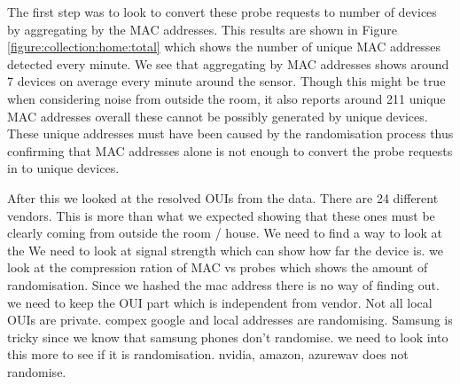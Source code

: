 The first step was to look to convert these probe requests to number of devices by aggregating by the MAC addresses.
This results are shown in Figure \ref{figure:collection:home:total} which shows the number of unique MAC addresses detected every minute.
We see that aggregating by MAC addresses shows around 7 devices on average every minute around the sensor.
Though this might be true when considering noise from outside the room, it also reports around 211 unique MAC addresses overall these cannot be possibly generated by unique devices.
These unique addresses must have been caused by the randomisation process thus confirming that MAC addresses alone is not enough to convert the probe requests in to unique devices.

After this we looked at the resolved OUIs from the data.
There are 24 different vendors.
This is more than what we expected showing that these ones must be clearly coming from outside the room / house.
We need to find a way to look at the
We need to look at signal strength which can show how far the device is.
we look at the compression ration of MAC vs probes which shows the amount of randomisation.
Since we hashed the mac address there is no way of finding out. we need to keep the OUI part which is independent from vendor. Not all local OUIs are private.
compex google and local addresses are randomising.
Samsung is tricky since we know that samsung phones don't randomise. we need to look into this more to see if it is randomisation.
nvidia, amazon, azurewav does not randomise.

